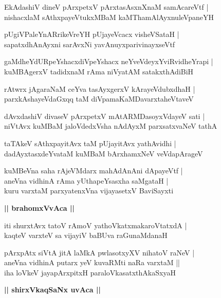 \documentclass[twoside,12pt,openright]{book}
\newcounter{shloka}[chapter]
\def\uvaca#1{\centerline{{\large\textbf{#1}}}}
\begin{document}
\begin{shloka}%
EkAdashiV dineV pArxpetxV pArxtasAsxnXnaM samAcareVtf |\\
nishacxlaM sAthxpayeVtukxMBaM kaMThamAlAyxnuleVpaneYH 
\end{shloka}

\begin{shloka}%
pUgiVPaleYnARrikeVreYH pUjayeVcacx visheVSataH |\\
sapatxdhAnAyxni sarAvxNi yavAnuyxparivinayxseVtf
\end{shloka}

\begin{shloka}%
gaMdheYdURpeYshacxdiVpeYshacx neYveVdeyxYviRvidheYrapi |\\
kuMBAgerxV tadidxnaM rAma niVyatAM satakxthAdiBiH 
\end{shloka}

\begin{shloka}%
rAtwrx jAgaraNaM ceYva tasAyxgerxV kArayeVdubxdhaH |\\
parxkAshayeVdaGxqq taM diVpamaKaMDavarxtaheVtaveV
\end{shloka}

\begin{shloka}%
dAvxdashiV divaseV pArxpetxV mAtARMDasoyxVdayeV sati |\\
niVtAvx kuMBaM jaloVdedxVsha nAdAyxM parxsatxvaNeV tathA
\end{shloka}

\begin{shloka}%
taTAkeV sAthxpayitAvx taM pUjayitAvx yathAvidhi |\\
dadAyxtasxdeYvataM kuMBaM bArxhamxNeV veVdapArageV 
\end{shloka}

\begin{shloka}%
kuMBeVna saha rAjeVMdarx mahAdAnAni dApayeVtf |\\
aneVna vidhinA rAma yUthapeYsasxha saMgataH |\\
kuru varxtaM parxyatenxVna vijayasetxV BaviSayxti
\end{shloka}

\uvaca{|| brahomxVvAca ||}

\begin{shloka}%
iti shurxtAvx tatoV rAmoV yathoVkatxmakaroVtatxdA |\\
kaqteV varxteV sa vijayiV baBUva raGunaMdanaH 
\end{shloka}

\begin{shloka}%
pArxpAtx siVtA jitA laMkA pwlasotxyXV nihatoV raNeV |\\
aneVna vidhinA putarx yeV kuvaRMti naRa varxtaM ||\\
iha loVkeV jayapArxpitxH paraloVkasatxthAkaSxyaH 
\end{shloka}
\uvaca{|| shirxVkaqSaNx uvAca ||}
\end{document}
